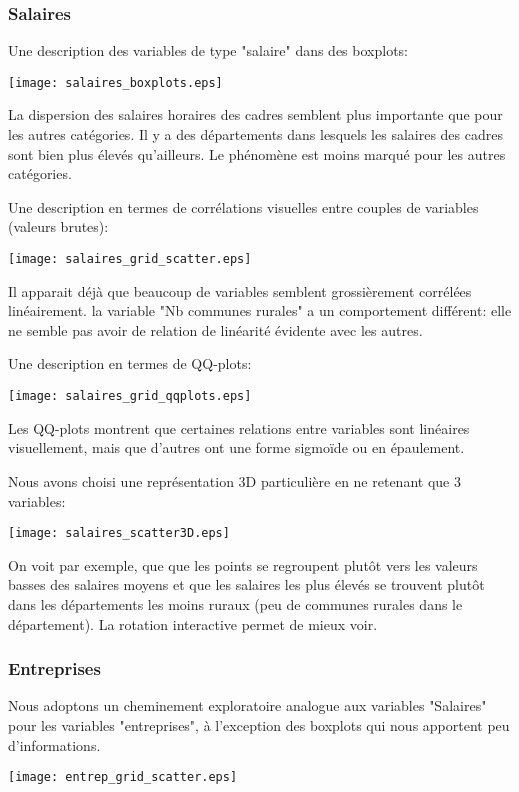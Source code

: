 \documentclass[a4paper,11pt]{article}
\begin{document}
\subsubsection{Salaires}
Une description des variables de type "salaire" dans des boxplots:
\begin{center}
\texttt{[image: salaires\_boxplots.eps]}
\end{center}
La dispersion des salaires horaires des cadres semblent plus importante que pour les autres catégories.
Il y a des départements dans lesquels les salaires des cadres sont bien plus élevés qu'ailleurs.
Le phénomène est moins marqué pour les autres catégories.

\medskip
Une description en termes de corrélations visuelles entre couples de variables (valeurs brutes):
\begin{center}
\texttt{[image: salaires\_grid\_scatter.eps]}
\end{center}
Il apparait déjà que beaucoup de variables semblent grossièrement corrélées linéairement.
la variable "Nb communes rurales" a un comportement différent: elle ne semble pas avoir de relation de linéarité évidente avec les autres.

\medskip
Une description en termes de QQ-plots:
\begin{center}
\texttt{[image: salaires\_grid\_qqplots.eps]}
\end{center}
Les QQ-plots  montrent que certaines relations entre variables sont linéaires visuellement, mais que d'autres ont une forme sigmoïde ou en épaulement.

\medskip
Nous avons choisi une représentation 3D particulière en ne retenant que 3 variables:
\begin{center}
\texttt{[image: salaires\_scatter3D.eps]}
\end{center}
On voit par exemple, que que les points se regroupent plutôt vers les valeurs basses des salaires moyens et que les salaires les plus élevés se trouvent plutôt dans les départements les moins ruraux (peu de communes rurales dans le département).
La rotation interactive permet de mieux voir.

\subsubsection{Entreprises}

Nous adoptons un cheminement exploratoire analogue aux variables "Salaires" pour les variables "entreprises", à l'exception des boxplots qui nous apportent peu d'informations.
\begin{center}
\texttt{[image: entrep\_grid\_scatter.eps]}
\end{center}
\end{document}
